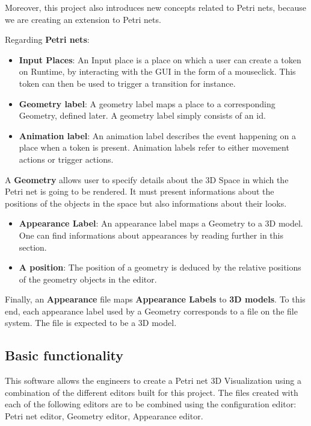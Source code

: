 Moreover, this project also introduces new concepts related to Petri nets, because we are creating an extension to Petri nets.

Regarding \textbf{Petri nets}:
\begin{itemize}
  \item \textbf{Input Places}: An Input place is a place on which a user can create a token on Runtime, by interacting with the GUI in the form of a mouseclick. This token can then be used to trigger a transition for instance.
  \item \textbf{Geometry label}: A geometry label maps a place to a corresponding Geometry, defined later.
  A geometry label simply consists of an id.

  \item \textbf{Animation label}: An animation label describes the event happening on a place when a token is present.
Animation labels refer to either movement actions or trigger actions.\end{itemize}

A \textbf{Geometry} allows user to specify details about the 3D Space in which the Petri net is going to be rendered. It must present informations about the positions of the objects in the space but also informations about their looks.

\begin{itemize}
  \item \textbf{Appearance Label}: An appearance label maps a Geometry to a 3D model. One can find informations about appearances by reading further in this section.
  \item \textbf{A position}: The position of a geometry is deduced by the relative positions of the geometry objects in the editor. 
\end{itemize}

Finally, an \textbf{Appearance} file maps \textbf{Appearance Labels} to \textbf{3D models}.
To this end, each appearance label used by a Geometry corresponds to a file on the file system. The file is expected to be a 3D model.

\subsection{Basic functionality}


This software allows the engineers to create a Petri net 3D Visualization using a combination of the different editors built for this project.
The files created with each of the following editors are to be combined using the configuration editor: \newline
Petri net editor, Geometry editor, Appearance editor. 

